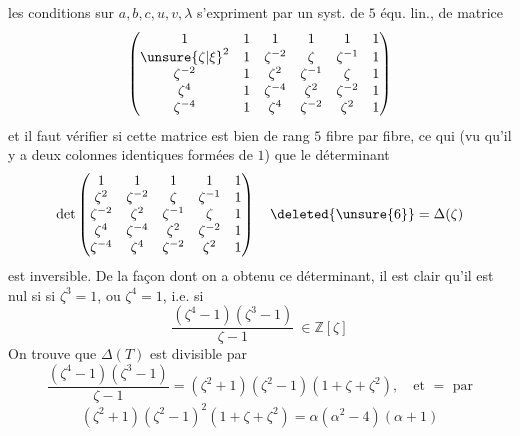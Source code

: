 les conditions sur $a,b,c,u,v,\lambda$ s'expriment par un syst. de $5$ équ. lin., de matrice
\[
\begin{pmatrix}
1&1&1&1&1&1\\
{\unsure{\zeta|\xi}}^2&1&\zeta^{-2}&\zeta&\zeta^{-1}&1\\
\zeta^{-2}&1&\zeta^2&\zeta^{-1}&\zeta&1\\
\zeta^4&1&\zeta^{-4}&\zeta^2&\zeta^{-2}&1\\
\zeta^{-4}&1&\zeta^4&\zeta^{-2}&\zeta^2&1
\end{pmatrix}
\]
et il faut vérifier si  cette matrice  est bien de rang $5$ fibre par fibre, ce qui  (vu qu'il y a deux colonnes identiques formées de $1$) que le déterminant 
\[
\det\begin{pmatrix}
1&1&1&1&1\\
\zeta^2&\zeta^{-2}&\zeta&\zeta^{-1}&1\\
\zeta^{-2}&\zeta^2&\zeta^{-1}&\zeta&1\\
\zeta^4&\zeta^{-4}&\zeta^2&\zeta^{-2}&1\\
\zeta^{-4}&\zeta^4&\zeta^{-2}&\zeta^2&1
\end{pmatrix}\quad\deleted{\unsure{6}}=\Delta(\zeta)
\]
est inversible. De la façon dont on a obtenu ce déterminant, il  est clair qu'il est nul si  si $\zeta^3=1$, ou $\zeta^4=1$, i.e. si 
\[
\frac{(\zeta^4-1)(\zeta^3-1)}{\zeta-1}\ \in\mathbb Z[\zeta]
\]
On trouve que $\Delta(T)$ est divisible par
\[
\frac{(\zeta^4-1)(\zeta^3-1)}{\zeta-1}
=(\zeta^2+1)(\zeta^2-1)(1+\zeta+\zeta^2),\quad\text{et }=\text{ par}
\]
\[
(\zeta^2+1)(\zeta^2-1)^2(1+\zeta+\zeta^2)=\alpha(\alpha^2-4)(\alpha+1)
\]
